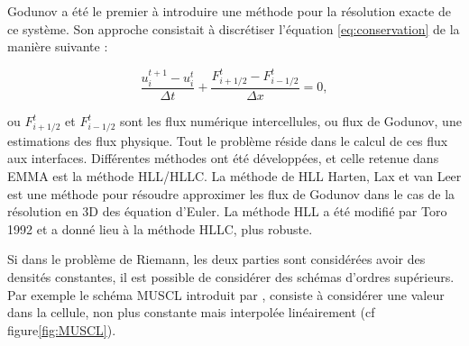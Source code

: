 %
%
%

Godunov \cite{MR0119433} a été le premier à introduire une méthode pour la résolution exacte de ce système.
Son approche consistait à discrétiser l'équation \ref{eq:conservation} de la manière suivante : 

\begin{equation}
\frac{ u^{t+1}_i - u^t_i }{\Delta t} + \frac{ F^t_{i+1/2} - F^t_{i-1/2} }{\Delta x} =0,
\label{eq:rad_solver}
\end{equation}

ou $F^t_{i+1/2}$ et $F^t_{i-1/2}$ sont les flux numérique intercellules, ou flux de Godunov, une estimations des flux physique.
Tout le problème réside dans le calcul de ces flux aux interfaces. %
Différentes méthodes ont été développées, et celle retenue dans EMMA est la méthode HLL/HLLC.
La méthode de HLL Harten, Lax et van Leer  est une méthode pour résoudre approximer les flux de Godunov dans le cas de la résolution en 3D des équation d'Euler.
La méthode HLL a été modifié par Toro 1992 et a donné lieu à la méthode HLLC, plus robuste.


Si dans le problème de Riemann, les deux parties sont considérées avoir des densités constantes, il est possible de considérer des schémas d'ordres supérieurs.
Par exemple le schéma \ac{MUSCL} introduit par \cite{1979JCoPh..32..101V},  consiste à considérer une valeur dans la cellule, non plus constante mais interpolée linéairement (cf figure\ref{fig:MUSCL}).

